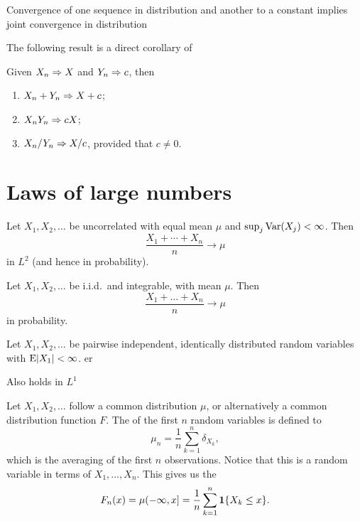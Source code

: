 Convergence of one sequence in distribution and another to a constant implies joint convergence in distribution

The following result is a direct corollary of 

\begin{namedthm}
    Given $X_n \Rightarrow X$ and $Y_n \Rightarrow c$, then \begin{enumerate}
        \item $X_n + Y_n \Rightarrow X + c$;
        \item $X_nY_n\Rightarrow cX$;
        \item $X_n/Y_n \Rightarrow X/c$, provided that $c \neq 0$.
    \end{enumerate}
\end{namedthm}



\section{Laws of large numbers}
\begin{namedthm}
    Let $X_1,X_2,\dotsc$ be uncorrelated with equal mean $\mu$ and $\sup_j\operatorname{Var}(X_j) < \infty$. Then \[
        \frac{X_1 + \dotsb + X_n}{n} \to \mu 
    \] in $L^2$ (and hence in probability).
\end{namedthm}

\begin{namedthm}
    Let $X_1,X_2,\dotsc$ be i.i.d.\ and integrable, with mean $\mu$. Then \[
        \frac{X_1 + \dotsc + X_n}{n} \to \mu
    \] in probability.
\end{namedthm}

\begin{namedthm}
    Let $X_1,X_2,\dotsc$ be pairwise independent, identically distributed random variables with $\mathop{}\!\mathrm{E} \lvert X_1 \rvert < \infty$. er 
\end{namedthm}

Also holds in $L^1$

\begin{namedthm}
    
\end{namedthm}

\begin{namedthm}
    
\end{namedthm}

Let $X_1,X_2,\dotsc$ follow a common distribution $\mu$, or alternatively a common distribution function $F$. The  of the first $n$ random variables is defined to \[
    \mu_n = \frac{1}{n} \sum_{k = 1}^n \delta_{X_k},
\] which is the averaging of the first $n$ observations. Notice that this is a random variable in terms of $X_1,\dotsc,X_n$. This gives us the  \[
    F_n(x) = \mu(-\infty,x] = \frac{1}{n} \sum_{k=1}^n \mathbf{1}\{X_k \leq x\}.
\]

